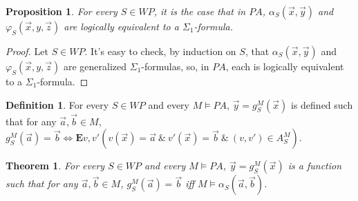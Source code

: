 \documentclass[a4paper,11pt]{article}
\begin{document}
\theoremstyle{plain}
\newtheorem{involved_formulas_are_sigma_1}[X_semantics_of_while_programs]{Proposition}
\begin{involved_formulas_are_sigma_1}
  For every $S\in WP$, it is the case that in $PA$, $\alpha_S(\vec{x},\vec{y})$ and $\varphi_S(\vec{x},y,\vec{z})$ are logically equivalent to a $\Sigma_1$-formula.
\end{involved_formulas_are_sigma_1}
\begin{proof}
  Let $S\in WP$. It's easy to check, by induction on $S$, that $\alpha_S(\vec{x},\vec{y})$ and $\varphi_S(\vec{x},y,\vec{z})$ are generalized $\Sigma_1$-formulas, so, in $PA$, each is logically equivalent to a $\Sigma_1$-formula.
\end{proof}

\theoremstyle{definition}
\newtheorem{M_computable_functions}[X_semantics_of_while_programs]{Definition}
\begin{M_computable_functions}\label{M_computable_functions}
For every $S\in WP$ and every $M\models PA$, $\vec{y} = g_S^M(\vec{x})$ is defined such that for any $\vec{a},\vec{b}\in M$, $g_S^M(\vec{a}) = \vec{b} \Leftrightarrow \textbf{E} v,v' ( v(\vec{x})=\vec{a}\ \&\ v'(\vec{x})=\vec{b}\ \&\ (v,v')\in A_S^M )$.
\end{M_computable_functions}

\theoremstyle{plain}
\newtheorem{arithmetical_definability_of_M_computable_functions}[X_semantics_of_while_programs]{Theorem}
\begin{arithmetical_definability_of_M_computable_functions}\label{arithmetical_definability_of_M_computable_functions}
For every $S\in WP$ and every $M\models PA$, $\vec{y} = g_S^M(\vec{x})$ is a function such that for any $\vec{a},\vec{b}\in M$, $g_S^M(\vec{a}) = \vec{b}$ iff $M \models \alpha_S(\vec{a},\vec{b})$.
\end{arithmetical_definability_of_M_computable_functions}
\end{document}
